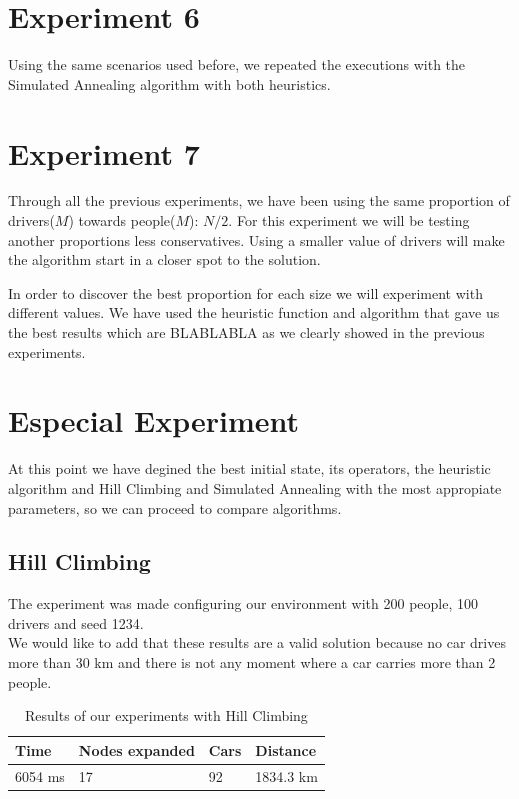 \documentclass[12]{article}
\begin{document}

\section{Experiment 6}
Using the same scenarios used before, we repeated the executions with the Simulated Annealing algorithm with both heuristics.



\section{Experiment 7}
Through all the previous experiments, we have been using the same proportion of drivers($M$) towards people($M$): $N/2$. For this experiment we will be testing another proportions less conservatives. Using a smaller value of drivers will make the algorithm start in a closer spot to the solution.

In order to discover the best proportion for each size we will experiment with different values. We have used the heuristic function and algorithm that gave us the best results which are BLABLABLA as we clearly showed in the previous experiments. 



\section{Especial Experiment}

At this point we have degined the best initial state, its operators, the heuristic algorithm and Hill Climbing and Simulated Annealing with the most appropiate parameters, so we can proceed to compare algorithms. 


\subsection{Hill Climbing}

The experiment was made configuring our environment with 200 people, 100 drivers and seed 1234.
\\

We would like to add that these results are a valid solution because no car drives more than 30 km and there is not any moment where a car carries more than 2 people. 
\\

\begin{table}[h]
\centering
\begin{tabular}{|l|l|l|l|}
\hline \textbf{Time} &
 \textbf{Nodes expanded} & \textbf{Cars} & \textbf{Distance}\\  \hline
6054 ms &  17 & 92 & 1834.3 km \\ \hline
\end{tabular}
\caption{Results of our experiments with Hill Climbing}
\label{Results}
\end{table}
\end{document}
